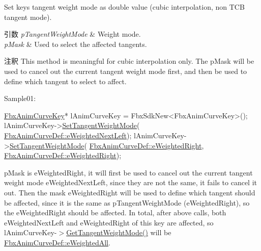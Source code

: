 Set key\textquotesingle{}s tangent weight mode as double value (cubic interpolation, non T\+CB tangent mode). 
\begin{DoxyParams}{引数}
{\em p\+Tangent\+Weight\+Mode} & Weight mode. \\
\hline
{\em p\+Mask} & Used to select the affected tangents. \\
\hline
\end{DoxyParams}
\begin{DoxyRemark}{注釈}
This method is meaningful for cubic interpolation only. The p\+Mask will be used to cancel out the current tangent weight mode first, and then be used to define which tangent to select to affect.
\end{DoxyRemark}
Sample01\+: 
\begin{DoxyCode}
\hyperlink{class_fbx_anim_curve_key}{FbxAnimCurveKey}* lAnimCurveKey = FbxSdkNew<FbxAnimCurveKey>();
lAnimCurveKey->\hyperlink{class_fbx_anim_curve_key_a418159da0643ccdbeb5aa59b69b821e0}{SetTangentWeightMode}(
      \hyperlink{class_fbx_anim_curve_def_aeee6e9cc12501e10dbd3e5caaf66990eae28d75f955feebe5756d77ad0765d000}{FbxAnimCurveDef::eWeightedNextLeft});
lAnimCurveKey->\hyperlink{class_fbx_anim_curve_key_a418159da0643ccdbeb5aa59b69b821e0}{SetTangentWeightMode}(
      \hyperlink{class_fbx_anim_curve_def_aeee6e9cc12501e10dbd3e5caaf66990ea869960737022db21fc64480daa22725a}{FbxAnimCurveDef::eWeightedRight}, 
      \hyperlink{class_fbx_anim_curve_def_aeee6e9cc12501e10dbd3e5caaf66990ea869960737022db21fc64480daa22725a}{FbxAnimCurveDef::eWeightedRight});
\end{DoxyCode}
 p\+Mask is e\+Weighted\+Right, it will first be used to cancel out the current tangent weight mode e\+Weighted\+Next\+Left, since they are not the same, it fails to cancel it out. Then the mask e\+Weighted\+Right will be used to define which tangent should be affected, since it is the same as p\+Tangent\+Weight\+Mode (e\+Weighted\+Right), so the e\+Weighted\+Right should be affected. In total, after above calls, both e\+Weighted\+Next\+Left and e\+Weighted\+Right of this key are affected, so l\+Anim\+Curve\+Key-\/$>$\hyperlink{class_fbx_anim_curve_key___impl_a78b901f289d94aafab0b8256c2a865e2}{Get\+Tangent\+Weight\+Mode()} will be \hyperlink{class_fbx_anim_curve_def_aeee6e9cc12501e10dbd3e5caaf66990ea4337e6853fab642c2a432ab1bb303922}{Fbx\+Anim\+Curve\+Def\+::e\+Weighted\+All}.

